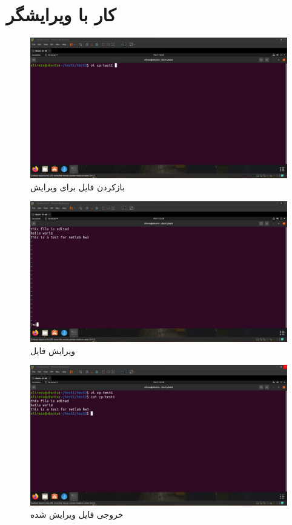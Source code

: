 \documentclass{article}
\begin{document}
\section{کار با ویرایشگر }
\begin{figure}[H]
    \centering
    \includegraphics[width=1.0\textwidth]{figures/4a1.jpg}
    \caption
	{
بازکردن فایل برای ویرایش
	}
    \label{fig:fig1}
\end{figure}

\begin{figure}[H]
    \centering
    \includegraphics[width=1.0\textwidth]{figures/4a2.jpg}
    \caption
	{
ویرایش فایل
	}
    \label{fig:fig1}
\end{figure}

\begin{figure}[H]
    \centering
    \includegraphics[width=1.0\textwidth]{figures/4a3.jpg}
    \caption
	{
خروجی فایل ویرایش شده
	}
    \label{fig:fig1}
\end{figure}
\end{document}

